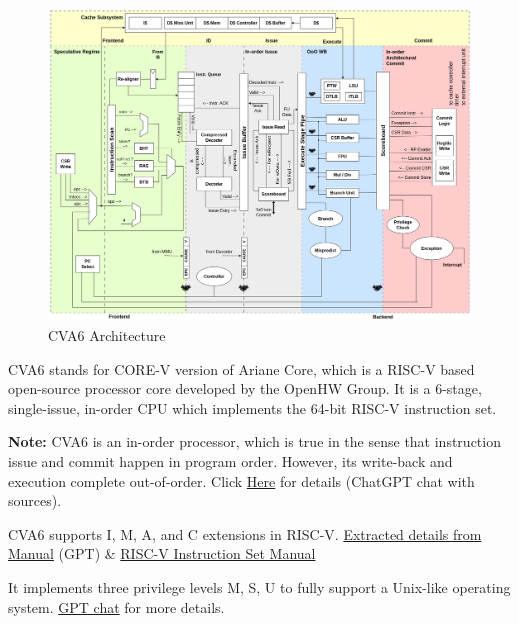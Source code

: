 \documentclass[12pt, a4paper]{article}
\begin{document}
\begin{figure}[h]
    \centering
    \includegraphics[width=1\textwidth]{CVA6.png}
    \caption{CVA6 Architecture}
    \label{fig:cva6_architecture}
\end{figure}    

CVA6 stands for CORE-V version of Ariane Core, which is a RISC-V based open-source processor core developed by the OpenHW Group. It is a 6-stage, single-issue, in-order CPU which implements the 64-bit RISC-V instruction set.

\vspace{0.4em}

\textbf{Note:} CVA6 is an in-order processor, which is true in the sense that instruction issue and commit happen in program order. However, its write-back and execution complete out-of-order. Click \href{https://chatgpt.com/s/t_6859b47774988191b23e0e92336e7668}{Here} for details (ChatGPT chat with sources).

\vspace{0.4em}

CVA6 supports I, M, A, and C extensions in RISC-V. \href{https://chatgpt.com/s/t_6859b7c99a1481919e4f0061d34eb39e}{Extracted details from Manual} (GPT) \& \href{https://www2.eecs.berkeley.edu/Pubs/TechRpts/2016/EECS-2016-118.pdf}{RISC-V Instruction Set Manual}

\vspace{0.4em}

It implements three privilege levels M, S, U to fully support a Unix-like operating system.
\href{https://chatgpt.com/s/t_6859b8e04be88191863e1d50b57d0f11}{GPT chat} for more details.
\end{document}
